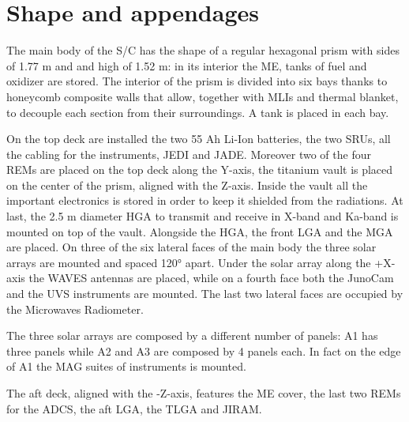 \section{Shape and appendages}
\label{sec:shape_appendages}

The main body of the S/C has the shape of a regular hexagonal prism with sides of 1.77 m and and high of 1.52 m: in its interior the ME, tanks of fuel and oxidizer are stored. The interior of the prism is divided into six bays thanks to honeycomb composite walls that allow, together with MLIs and thermal blanket, to decouple each section from their surroundings. A tank is placed in each bay. 

On the top deck are installed the two 55 Ah Li-Ion batteries, the two SRUs, all the cabling for the instruments, JEDI and JADE. Moreover two of the four REMs are placed on the top deck along the Y-axis, the titanium vault is placed on the center of the prism, aligned with the Z-axis. Inside the vault all the important electronics is stored in order to keep it shielded from the radiations. At last, the 2.5 m diameter HGA to transmit and receive in X-band and Ka-band is mounted on top of the vault. Alongside the HGA, the front LGA and the MGA are placed. On three of the six lateral faces of the main body the three solar arrays are mounted and spaced 120° apart. Under the solar array along the +X-axis 
\mref 
the WAVES antennas are placed, while on a fourth face both the JunoCam and the UVS instruments are mounted. The last two lateral faces are occupied by the Microwaves Radiometer. 

The three solar arrays are composed by a different number of panels: A1 has three panels while A2 and A3 are composed by 4 panels each. In fact on the edge of A1 the MAG suites of instruments is mounted. 

The aft deck, aligned with the -Z-axis, features the ME cover, the last two REMs for the ADCS, the aft LGA, the TLGA and JIRAM.

